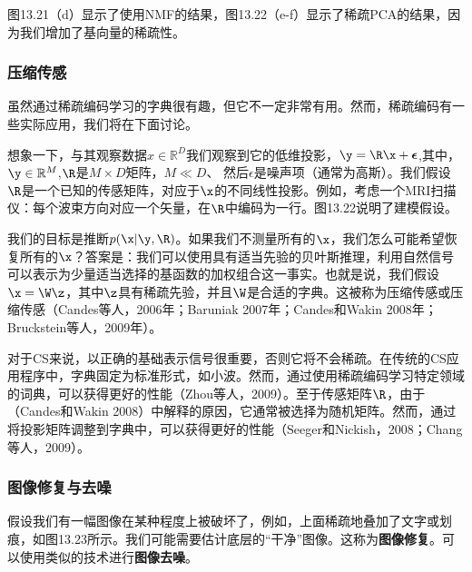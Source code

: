\documentclass[a4paper]{article}
\begin{document}
图13.21（d）显示了使用NMF的结果，图13.22（e-f）显示了稀疏PCA的结果，因为我们增加了基向量的稀疏性。

\clearpage
\subsubsection{压缩传感}
虽然通过稀疏编码学习的字典很有趣，但它不一定非常有用。然而，稀疏编码有一些实际应用，我们将在下面讨论。

想象一下，与其观察数据$x\in \mathbb{R}^D$我们观察到它的低维投影，$\y=\R\x+\boldsymbol{\epsilon}$,其中，$\y\in \mathbb{R}^M$,$\R$是$M\times D$矩阵，$M\ll D$、 然后$\epsilon$是噪声项（通常为高斯）。我们假设$\R$是一个已知的传感矩阵，对应于$\x$的不同线性投影。例如，考虑一个MRI扫描仪：每个波束方向对应一个矢量，在$\R$中编码为一行。图13.22说明了建模假设。

我们的目标是推断$p(\x|\y,\R)$。如果我们不测量所有的$\x$，我们怎么可能希望恢复所有的$\x$？答案是：我们可以使用具有适当先验的贝叶斯推理，利用自然信号可以表示为少量适当选择的基函数的加权组合这一事实。也就是说，我们假设$\x=\W\z$，其中$\z$具有稀疏先验，并且$\W$是合适的字典。这被称为压缩传感或压缩传感（Candes等人，2006年；Baruniak 2007年；Candes和Wakin 2008年；Bruckstein等人，2009年）。

对于CS来说，以正确的基础表示信号很重要，否则它将不会稀疏。在传统的CS应用程序中，字典固定为标准形式，如小波。然而，通过使用稀疏编码学习特定领域的词典，可以获得更好的性能（Zhou等人，2009）。至于传感矩阵$\R$，由于（Candes和Wakin 2008）中解释的原因，它通常被选择为随机矩阵。然而，通过将投影矩阵调整到字典中，可以获得更好的性能（Seeger和Nickish，2008；Chang等人，2009）。

\subsubsection{图像修复与去噪}
假设我们有一幅图像在某种程度上被破坏了，例如，上面稀疏地叠加了文字或划痕，如图13.23所示。我们可能需要估计底层的“干净”图像。这称为\textbf{图像修复}。可以使用类似的技术进行\textbf{图像去噪}。
\end{document}
